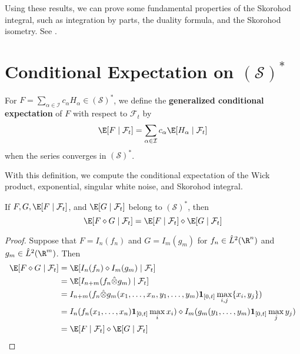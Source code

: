   Using these results, we can prove some fundamental properties of the Skorohod integral, such as integration by parts, the duality formula, and the Skorohod isometry. See \cite{nunno2008malliavin}. 

  \section{Conditional Expectation on $(\mathcal{S})^\ast$}


  \begin{definition} 
    For $F = \sum_{\alpha \in \mathcal{I}} c_\alpha H_\alpha \in (\mathcal{S})^\ast$, we define the \textbf{generalized conditional expectation} of $F$ with respect to $\mathcal{F}_t$ by 
  \begin{equation}
  \E [F \mid \mathcal{F}_t] = \sum_{\alpha \in \mathcal{I}} c_\alpha \E [H_\alpha \mid \mathcal{F}_t] 
  \end{equation}
  when the series converges in $(\mathcal{S})^\ast$.
  \end{definition}

  With this definition, we compute the conditional expectation of the Wick product, exponential, singular white noise, and Skorohod integral. 

  \begin{lemma}\label{lm:202405061617}
    If $F, G, \E [F \mid \mathcal{F}_t]$, and $\E [G \mid \mathcal{F}_t]$ belong to $(\mathcal{S})^\ast$, then 
    \[
      \E [F \diamond G \mid \mathcal{F}_t] = \E [F \mid \mathcal{F}_t] \diamond \E [G \mid \mathcal{F}_t]
    \]
  \end{lemma}

  \begin{proof}
    Suppose that $F = I_n(f_n)$ and $G = I_m(g_m)$ for $f_n \in \hat{L}^2(\R^n)$ and $g_m \in \hat{L}^2(\R^m)$. Then 
    \begin{equation*}
      \begin{aligned}
        \E [F \diamond G \mid \mathcal{F}_t] &= \E [I_n(f_n) \diamond I_m(g_m) \mid \mathcal{F}_t] \\ 
                                             &= \E [I_{n+m}(f_n \hat{\otimes} g_m) \mid \mathcal{F}_t] \\ 
                                             &= I_{n+m}(f_n \hat{\otimes} g_m (x_1, \ldots, x_n, y_1, \ldots, y_m) \mathbf{1}_{[0,t]} \max_{i,j} \{ x_i, y_j \} ) \\
                                             &= I_n (f_n (x_1, \ldots, x_n) \mathbf{1}_{[0,t]} \max_{i} x_i ) \diamond I_m (g_m (y_1, \ldots, y_m) \mathbf{1}_{[0,t]} \max_{j} y_j ) \\
                                             &= \E [F \mid \mathcal{F}_t] \diamond \E [G \mid \mathcal{F}_t]
      \end{aligned}
      \label{eq:202405021718}
    \end{equation*}
  \end{proof}

